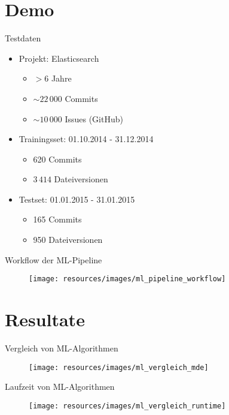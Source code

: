 \documentclass[12pt]{beamer}
\begin{document}
\section{Demo}	%
\begin{frame}[fragile]{Testdaten}
	\begin{itemize}
		\item Projekt: \alert{Elasticsearch}
		\begin{itemize}
			\item $> 6$ Jahre
			\item $\sim 22\,000$ Commits
			\item $\sim 10\,000$ Issues (GitHub)
		\end{itemize}
		\item Trainingsset: 01.10.2014 - 31.12.2014
		\begin{itemize}
			\item 620 Commits
			\item $3\,414$ Dateiversionen
		\end{itemize}
		\item Testset: 01.01.2015 - 31.01.2015 
		\begin{itemize}
			\item 165 Commits
			\item 950 Dateiversionen
		\end{itemize}
	\end{itemize}
\end{frame}

\begin{frame}[fragile]{Workflow der ML-Pipeline}
	\begin{figure}[h!]
		\centering
		\texttt{[image: resources/images/ml\_pipeline\_workflow]}
		\label{fig:ml_comparisation_runtime}
	\end{figure}
\end{frame}


\section{Resultate}	%

\begin{frame}[fragile]{Vergleich von ML-Algorithmen}
	\begin{figure}[h!]
		\centering
		\texttt{[image: resources/images/ml\_vergleich\_mde]}
	\end{figure}
\end{frame}

\begin{frame}[fragile]{Laufzeit von ML-Algorithmen}
	\begin{figure}[h!]
		\centering
		\texttt{[image: resources/images/ml\_vergleich\_runtime]}
	\end{figure}
\end{frame}
\end{document}
